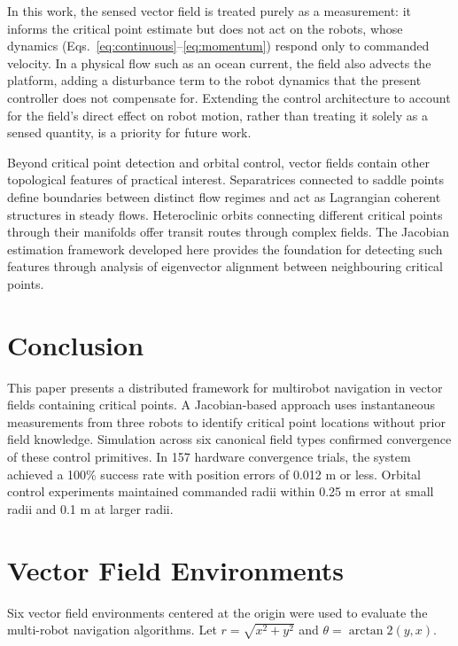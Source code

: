 \documentclass[lettersize,journal]{IEEEtran}
\begin{document}
In this work, the sensed vector field is treated purely as a measurement: it informs the critical point estimate but does not act on the robots, whose dynamics (Eqs.~\ref{eq:continuous}--\ref{eq:momentum}) respond only to commanded velocity. In a physical flow such as an ocean current, the field also advects the platform, adding a disturbance term to the robot dynamics that the present controller does not compensate for. Extending the control architecture to account for the field's direct effect on robot motion, rather than treating it solely as a sensed quantity, is a priority for future work.

Beyond critical point detection and orbital control, vector fields contain other topological features of practical interest. Separatrices connected to saddle points define boundaries between distinct flow regimes and act as Lagrangian coherent structures in steady flows. Heteroclinic orbits connecting different critical points through their manifolds offer transit routes through complex fields. The Jacobian estimation framework developed here provides the foundation for detecting such features through analysis of eigenvector alignment between neighbouring critical points.



\section{Conclusion}
\noindent

This paper presents a distributed framework for multirobot navigation in vector fields containing critical points. A Jacobian-based approach uses instantaneous measurements from three robots to identify critical point locations without prior field knowledge. Simulation across six canonical field types confirmed convergence of these control primitives. In 157 hardware convergence trials, the system achieved a 100\% success rate with position errors of 0.012 m or less. Orbital control experiments maintained commanded radii within 0.25 m error at small radii and 0.1 m at larger radii.


\appendices

\section{Vector Field Environments}
\label{sec:appendix_vector_fields}

Six vector field environments centered at the origin were used to evaluate the multi-robot navigation algorithms. Let $r = \sqrt{x^2 + y^2}$ and $\theta = \arctan2(y, x)$.
\end{document}
